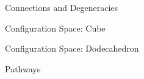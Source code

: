 \documentclass{beamer}
\begin{document}
\begin{frame}{Connections and Degeneracies}
\end{frame}
\begin{frame}{Configuration Space: Cube}
\end{frame}
\begin{frame}{Configuration Space: Dodecahedron}
\end{frame}
\begin{frame}{Pathways}
\end{frame}
\end{document}
